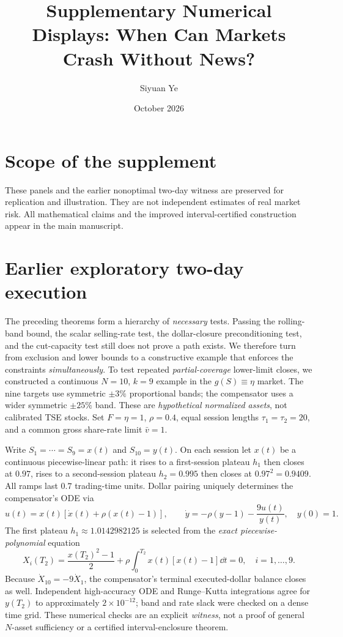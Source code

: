 \documentclass[10pt]{article}
\title{Supplementary Numerical Displays: When Can Markets Crash Without News?}
\author{Siyuan Ye}\date{October 2026}
\begin{document}
\maketitle
\section*{Scope of the supplement}
These panels and the earlier nonoptimal two-day witness are preserved for replication and illustration. They are not independent estimates of real market risk. All mathematical claims and the improved interval-certified construction appear in the main manuscript.
\section*{Earlier exploratory two-day execution}

The preceding theorems form a hierarchy of \emph{necessary} tests. Passing the rolling-band bound, the scalar selling-rate test, the dollar-closure preconditioning test, and the cut-capacity test still does not prove a path exists. We therefore turn from exclusion and lower bounds to a constructive example that enforces the constraints \emph{simultaneously}. To test repeated \emph{partial-coverage} lower-limit closes, we constructed a continuous $N=10$, $k=9$ example in the $g(S)\equiv\eta$ market. The nine targets use symmetric $\pm3\%$ proportional bands; the compensator uses a wider symmetric $\pm25\%$ band. These are \emph{hypothetical normalized assets}, not calibrated TSE stocks. Set $F=\eta=1$, $\rho=0.4$, equal session lengths $\tau_1=\tau_2=20$, and a common gross share-rate limit $\bar v=1$.

Write $S_1=\cdots=S_9=x(t)$ and $S_{10}=y(t)$. On each session let $x(t)$ be a continuous piecewise-linear path: it rises to a first-session plateau $h_1$ then closes at $0.97$, rises to a second-session plateau $h_2=0.995$ then closes at $0.97^2=0.9409$. All ramps last $0.7$ trading-time units. Dollar pairing uniquely determines the compensator's ODE via
\begin{equation}\label{eq:multiday-witness-ode}
 u(t)=x(t)[\dot x(t)+\rho(x(t)-1)],\qquad
 \dot y=-\rho(y-1)-\frac{9u(t)}{y(t)},\quad y(0)=1.
\end{equation}
The first plateau $h_1\approx1.0142982125$ is selected from the \emph{exact piecewise-polynomial} equation
\begin{equation}\label{eq:multiday-closed}
 X_i(T_2)=\frac{x(T_2)^2-1}{2}+\rho\int_0^{T_2}x(t)[x(t)-1]\dd t=0,
 \quad i=1,\ldots,9.
\end{equation}
Because $\dot X_{10}=-9\dot X_1$, the compensator's terminal executed-dollar balance closes as well. Independent high-accuracy ODE and Runge--Kutta integrations agree for $y(T_2)$ to approximately $2\times10^{-12}$; band and rate slack were checked on a dense time grid. These numerical checks are an explicit \emph{witness}, not a proof of general $N$-asset sufficiency or a certified interval-enclosure theorem.
\end{document}

